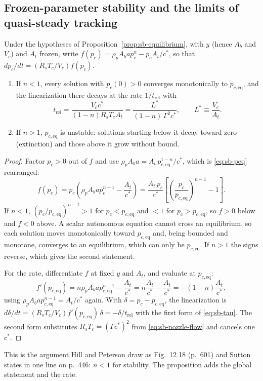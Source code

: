 \subsection{Frozen-parameter stability and the limits of quasi-steady tracking}
\begin{proposition}\label{prop:sb-stability}
Under the hypotheses of Proposition~\ref{prop:sb-equilibrium}, with $y$
(hence $A_b$ and $V_c$) and $A_t$ frozen, write
$f(p_c)=\rho_pA_bap_c^n-p_cA_t/c^*$, so that
$dp_c/dt=(R_sT_c/V_c)f(p_c)$.
\begin{enumerate}
\item If $n<1$, every solution with $p_c(0)>0$ converges monotonically to
$p_{c,\mathrm{eq}}$, and the linearization there decays at the rate
$1/t_{\mathrm{rel}}$ with
\begin{equation}\label{eq:sb-tau}
 t_{\mathrm{rel}}=\frac{V_c c^*}{(1-n)R_sT_cA_t}=\frac{L^*}{(1-n)\,\Gamma^2c^*},
 \qquad L^*\equiv\frac{V_c}{A_t}.
\end{equation}
\item If $n>1$, $p_{c,\mathrm{eq}}$ is unstable: solutions starting below it
decay toward zero (extinction) and those above it grow without bound.
\end{enumerate}
\end{proposition}
\begin{proof}
Factor $p_c>0$ out of $f$ and use $\rho_pA_ba=A_t\,p_{c,\mathrm{eq}}^{1-n}/c^*$,
which is \eqref{eq:sb-peq} rearranged:
\[
 f(p_c)=p_c\left(\rho_pA_bap_c^{n-1}-\frac{A_t}{c^*}\right)
 =\frac{A_t\,p_c}{c^*}\left[\left(\frac{p_c}{p_{c,\mathrm{eq}}}\right)^{n-1}-1\right].
\]
If $n<1$, $(p_c/p_{c,\mathrm{eq}})^{n-1}>1$ for $p_c<p_{c,\mathrm{eq}}$ and $<1$
for $p_c>p_{c,\mathrm{eq}}$, so $f>0$ below and $f<0$ above. A scalar
autonomous equation cannot cross an equilibrium, so each solution moves
monotonically toward $p_{c,\mathrm{eq}}$ and, being bounded and monotone,
converges to an equilibrium, which can only be $p_{c,\mathrm{eq}}$. If $n>1$ the
signs reverse, which gives the second statement.

For the rate, differentiate $f$ at fixed $y$ and $A_t$, and evaluate at
$p_{c,\mathrm{eq}}$:
\[
 f'(p_{c,\mathrm{eq}})=n\rho_pA_bap_{c,\mathrm{eq}}^{n-1}-\frac{A_t}{c^*}
 =n\frac{A_t}{c^*}-\frac{A_t}{c^*}=-(1-n)\frac{A_t}{c^*},
\]
using $\rho_pA_bap_{c,\mathrm{eq}}^{n-1}=A_t/c^*$ again. With
$\delta=p_c-p_{c,\mathrm{eq}}$, the linearization is
$d\delta/dt=(R_sT_c/V_c)f'(p_{c,\mathrm{eq}})\,\delta=-\delta/t_{\mathrm{rel}}$ with the first
form of \eqref{eq:sb-tau}. The second form substitutes
$R_sT_c=(\Gamma c^*)^2$ from \eqref{eq:sb-nozzle-flow} and cancels one $c^*$.
\end{proof}
This is the argument Hill and Peterson draw as Fig.~12.18 (p.~601) and Sutton
states in one line on p.~446: $n<1$ for stability. The proposition adds the
global statement and the rate.

